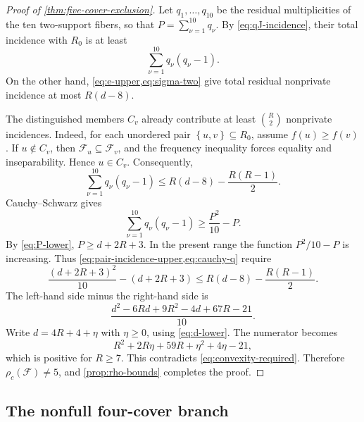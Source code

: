\documentclass[11pt,reqno]{amsart}
\numberwithin{equation}{section}
\theoremstyle{definition}
\theoremstyle{remark}
\newcommand{\F}{\mathcal{F}}
\newcommand{\1}{\mathbf{1}}
\newcommand{\set}[1]{\left\{#1\right\}}
\begin{document}
\begin{proof}[Proof of \cref{thm:five-cover-exclusion}]
Let \(q_1,\dots,q_{10}\) be the residual multiplicities of the ten two-support fibers, so that \(P=\sum_{\nu=1}^{10}q_\nu\).  By \cref{eq:qJ-incidence}, their total incidence with \(R_0\) is at least
\begin{equation}\label{eq:pair-incidence-lower}
\sum_{\nu=1}^{10}q_\nu(q_\nu-1).
\end{equation}
On the other hand, \cref{eq:e-upper,eq:sigma-two} give total residual nonprivate incidence at most \(R(d-8)\).

The distinguished members \(C_v\) already contribute at least \(\binom R2\) nonprivate incidences.  Indeed, for each unordered pair \(\set{u,v}\subseteq R_0\), assume \(f(u)\ge f(v)\).  If \(u\notin C_v\), then \(\F_u\subseteq\F_v\), and the frequency inequality forces equality and inseparability.  Hence \(u\in C_v\).  Consequently,
\begin{equation}\label{eq:pair-incidence-upper}
\sum_{\nu=1}^{10}q_\nu(q_\nu-1)
\le
R(d-8)-\frac{R(R-1)}2.
\end{equation}
Cauchy--Schwarz gives
\begin{equation}\label{eq:cauchy-q}
\sum_{\nu=1}^{10}q_\nu(q_\nu-1)
\ge
\frac{P^2}{10}-P.
\end{equation}
By \cref{eq:P-lower}, \(P\ge d+2R+3\).  In the present range the function \(P^2/10-P\) is increasing.  Thus \cref{eq:pair-incidence-upper,eq:cauchy-q} require
\begin{equation}\label{eq:convexity-required}
\frac{(d+2R+3)^2}{10}-(d+2R+3)
\le
R(d-8)-\frac{R(R-1)}2.
\end{equation}
The left-hand side minus the right-hand side is
\[
\frac{d^2-6Rd+9R^2-4d+67R-21}{10}.
\]
Write \(d=4R+4+\eta\) with \(\eta\ge0\), using \cref{eq:d-lower}.  The numerator becomes
\[
R^2+2R\eta+59R+\eta^2+4\eta-21,
\]
which is positive for \(R\ge7\).  This contradicts \cref{eq:convexity-required}.  Therefore \(\rho_c(\F)\ne5\), and \cref{prop:rho-bounds} completes the proof.
\end{proof}

\subsection{The nonfull four-cover branch}
\end{document}
